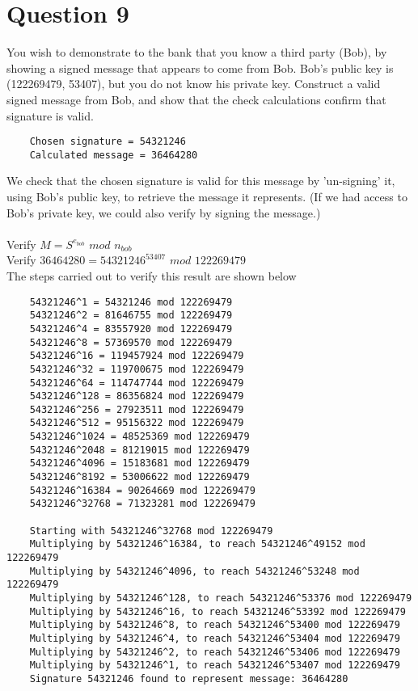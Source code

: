 \documentclass[a4paper,12pt]{article}
\begin{document}
\section*{Question 9}
You wish to demonstrate to the bank that you know a third party (Bob), by showing a signed message that appears to come from Bob. Bob’s public key is (122269479, 53407), but you do not know his private key. Construct a valid signed message from Bob, and show that the check calculations confirm that signature is valid.
\begin{verbatim}
    Chosen signature = 54321246
    Calculated message = 36464280
\end{verbatim}
We check that the chosen signature is valid for this message by 'un-signing' it, using Bob's public key, to retrieve the message it represents. (If we had access to Bob's private key, we could also verify by signing the message.)\\\\
Verify $M = S^{e_{bob}}$ $mod$ $n_{bob}$\\
Verify $36464280 = 54321246^{53407}$ $mod$ $122269479$\\
The steps carried out to verify this result are shown below
\begin{verbatim}
    54321246^1 = 54321246 mod 122269479
    54321246^2 = 81646755 mod 122269479
    54321246^4 = 83557920 mod 122269479
    54321246^8 = 57369570 mod 122269479
    54321246^16 = 119457924 mod 122269479
    54321246^32 = 119700675 mod 122269479
    54321246^64 = 114747744 mod 122269479
    54321246^128 = 86356824 mod 122269479
    54321246^256 = 27923511 mod 122269479
    54321246^512 = 95156322 mod 122269479
    54321246^1024 = 48525369 mod 122269479
    54321246^2048 = 81219015 mod 122269479
    54321246^4096 = 15183681 mod 122269479
    54321246^8192 = 53006622 mod 122269479
    54321246^16384 = 90264669 mod 122269479
    54321246^32768 = 71323281 mod 122269479

    Starting with 54321246^32768 mod 122269479
    Multiplying by 54321246^16384, to reach 54321246^49152 mod 122269479
    Multiplying by 54321246^4096, to reach 54321246^53248 mod 122269479
    Multiplying by 54321246^128, to reach 54321246^53376 mod 122269479
    Multiplying by 54321246^16, to reach 54321246^53392 mod 122269479
    Multiplying by 54321246^8, to reach 54321246^53400 mod 122269479
    Multiplying by 54321246^4, to reach 54321246^53404 mod 122269479
    Multiplying by 54321246^2, to reach 54321246^53406 mod 122269479
    Multiplying by 54321246^1, to reach 54321246^53407 mod 122269479
    Signature 54321246 found to represent message: 36464280
\end{verbatim}
\end{document}
